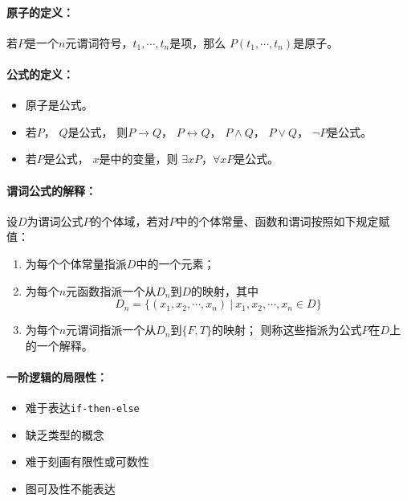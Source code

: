 \paragraph{原子的定义：}
若$P$是一个$n$元谓词符号，$t_1,\cdots,t_n$是项，那么
$P(t_1,\cdots,t_n)$是原子。
\paragraph{公式的定义：}
\begin{itemize}
        \item 原子是公式。
        \item 若$P$， $Q$是公式，
                则$P \rightarrow Q$， $P \leftrightarrow Q$，
                $P \land Q$， $P \lor Q$， $\lnot P$是公式。
        \item 若$P$是公式， $x$是中的变量，则
                $\exists x P$，$\forall x P$是公式。
\end{itemize}

\paragraph{谓词公式的解释：}
设$D$为谓词公式$P$的个体域，若对$P$中的个体常量、函数和谓词按照如下规定赋值：
\begin{enumerate}
        \item 为每个个体常量指派$D$中的一个元素；
        \item 为每个$n$元函数指派一个从$D_n$到$D$的映射，其中
                \begin{equation*}
                        D_n = \{ (x_1, x_2, \cdots, x_n) \  | \  x_1, x_2, \cdots, x_n \in D \}
                \end{equation*}
        \item 为每个$n$元谓词指派一个从$D_n$到$ \{F, T\} $的映射；
                则称这些指派为公式$P$在$D$上的一个解释。
\end{enumerate}

\paragraph{一阶逻辑的局限性：}
\begin{itemize}
        \item 难于表达\texttt{if-then-else}
        \item 缺乏类型的概念
        \item 难于刻画有限性或可数性
        \item 图可及性不能表达
\end{itemize}

